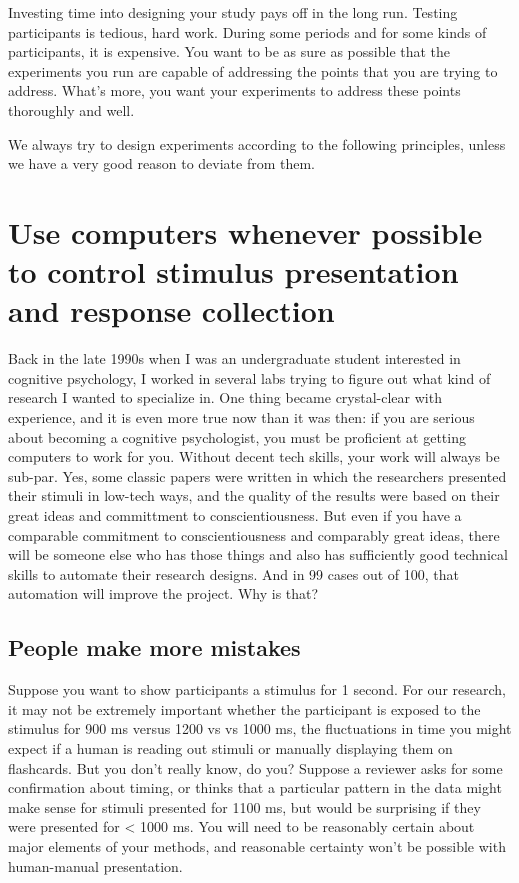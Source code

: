 \documentclass[
  12pt,
]{book}
\begin{document}
Investing time into designing your study pays off in the long run. Testing participants is tedious, hard work. During some periods and for some kinds of participants, it is expensive. You want to be as sure as possible that the experiments you run are capable of addressing the points that you are trying to address. What's more, you want your experiments to address these points thoroughly and well.

We always try to design experiments according to the following principles, unless we have a very good reason to deviate from them.

\section{Use computers whenever possible to control stimulus presentation and response collection}\label{use-computers-whenever-possible-to-control-stimulus-presentation-and-response-collection}

Back in the late 1990s when I was an undergraduate student interested in cognitive psychology, I worked in several labs trying to figure out what kind of research I wanted to specialize in. One thing became crystal-clear with experience, and it is even more true now than it was then: if you are serious about becoming a cognitive psychologist, you must be proficient at getting computers to work for you. Without decent tech skills, your work will always be sub-par. Yes, some classic papers were written in which the researchers presented their stimuli in low-tech ways, and the quality of the results were based on their great ideas and committment to conscientiousness. But even if you have a comparable commitment to conscientiousness and comparably great ideas, there will be someone else who has those things and also has sufficiently good technical skills to automate their research designs. And in 99 cases out of 100, that automation will improve the project. Why is that?

\subsection{People make more mistakes}\label{people-make-more-mistakes}

Suppose you want to show participants a stimulus for 1 second. For our research, it may not be extremely important whether the participant is exposed to the stimulus for 900 ms versus 1200 vs vs 1000 ms, the fluctuations in time you might expect if a human is reading out stimuli or manually displaying them on flashcards. But you don't really know, do you? Suppose a reviewer asks for some confirmation about timing, or thinks that a particular pattern in the data might make sense for stimuli presented for 1100 ms, but would be surprising if they were presented for \textless{} 1000 ms. You will need to be reasonably certain about major elements of your methods, and reasonable certainty won't be possible with human-manual presentation.
\end{document}
